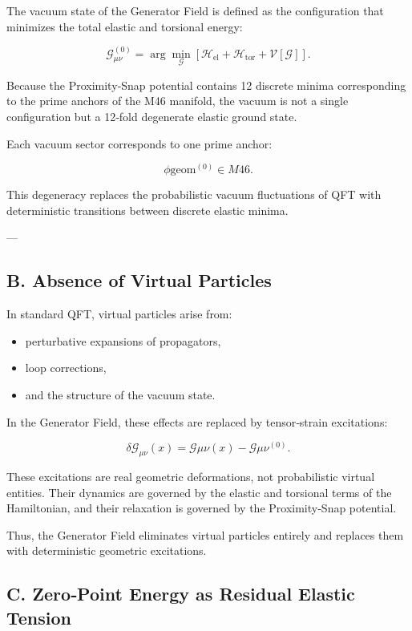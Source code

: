 \documentclass[reprint,amsmath,amssymb,aps,prl,floatfix]{revtex4-2}
\begin{document}
The vacuum state of the Generator Field is defined as the configuration that minimizes the total elastic and torsional energy:

\[
\mathcal{G}_{\mu\nu}^{(0)}
=
\arg\min_{\mathcal{G}} 
\left[
\mathcal{H}_{\mathrm{el}}
+
\mathcal{H}_{\mathrm{tor}}
+
\mathcal{V}[\mathcal{G}]
\right].
\]

Because the Proximity‑Snap potential contains 12 discrete minima corresponding to the prime anchors of the M46 manifold, the vacuum is not a single configuration but a 12‑fold degenerate elastic ground state.

Each vacuum sector corresponds to one prime anchor:

\[
\phi{\mathrm{geom}}^{(0)} \in M{46}.
\]

This degeneracy replaces the probabilistic vacuum fluctuations of QFT with deterministic transitions between discrete elastic minima.

---

\subsection{B. Absence of Virtual Particles}

In standard QFT, virtual particles arise from:
\begin{itemize}
\item perturbative expansions of propagators,  
\item loop corrections,  
\item and the structure of the vacuum state.
\end{itemize}

In the Generator Field, these effects are replaced by tensor‑strain excitations:

\[
\delta\mathcal{G}_{\mu\nu}(x)
=
\mathcal{G}{\mu\nu}(x) - \mathcal{G}{\mu\nu}^{(0)}.
\]

These excitations are real geometric deformations, not probabilistic virtual entities. Their dynamics are governed by the elastic and torsional terms of the Hamiltonian, and their relaxation is governed by the Proximity‑Snap potential.

Thus, the Generator Field eliminates virtual particles entirely and replaces them with deterministic geometric excitations.

\subsection{C. Zero‑Point Energy as Residual Elastic Tension}
\end{document}

